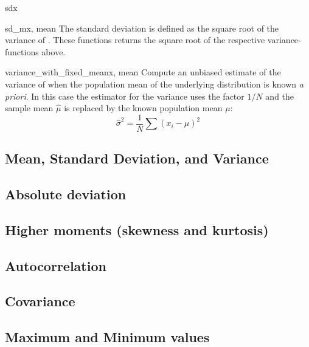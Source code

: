\begin{funcdesc}{sd}{x}
\end{funcdesc}
\begin{funcdesc}{sd_m}{x, mean}
   The standard deviation is defined as the square root of the variance of
   .  These functions returns the square root of the respective
   variance-functions above.
\end{funcdesc}

\begin{funcdesc}{variance_with_fixed_mean}{x, mean}
   Compute an unbiased estimate of the variance of  when the population
   mean  of the underlying distribution is known \emph{a priori}.  In
   this case the estimator for the variance uses the factor $1/N$ and the
   sample mean $\hat\mu$ is replaced by the known population mean $\mu$:
   \begin{equation}
      \hat\sigma^2 = \frac{1}{N} \sum (x_i - \mu)^2
   \end{equation}
\end{funcdesc}


\subsection{Mean, Standard Deviation, and Variance}
\label{sec:stat:mean-stand-deva}


\subsection{Absolute deviation}
\label{sec:stat:absolute-deviation}


\subsection{Higher moments (skewness and kurtosis)}
\label{sec:stat:high-moments-skewn}


\subsection{Autocorrelation}
\label{sec:stat:autocorrelation}


\subsection{Covariance}
\label{sec:stat:covariance}


\subsection{Maximum and Minimum values}
\label{sec:stat:max-min-value}


